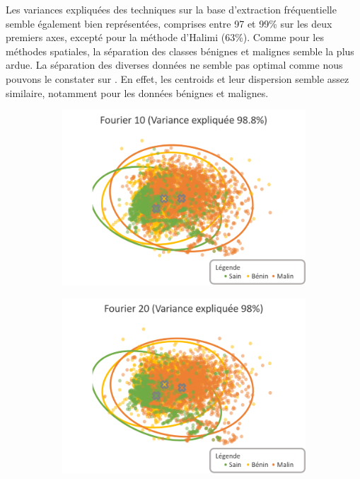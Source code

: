 Les variances expliquées des techniques sur la base d'extraction fréquentielle semble également bien représentées, comprises entre 97 et 99\% sur les deux premiers axes, excepté pour la méthode d'Halimi (63\%). Comme pour les méthodes spatiales, la séparation  des classes bénignes et malignes semble la plus ardue.
La séparation des diverses données ne semble pas optimal comme nous pouvons le constater sur . En effet, les centroids et leur dispersion semble assez similaire, notamment pour les données bénignes et malignes.\par

\begin{figure}[H]
    \centering
    \begin{subfigure}{.45\textwidth}
      \includegraphics[width=\textwidth]{contents/chapter_4/resources/visualisation_frequency_Fourier10.png}
    \end{subfigure}
    \begin{subfigure}{.45\textwidth}
      \includegraphics[width=\textwidth]{contents/chapter_4/resources/visualisation_frequency_Fourier20.png}
    \end{subfigure}
    

\end{figure}
